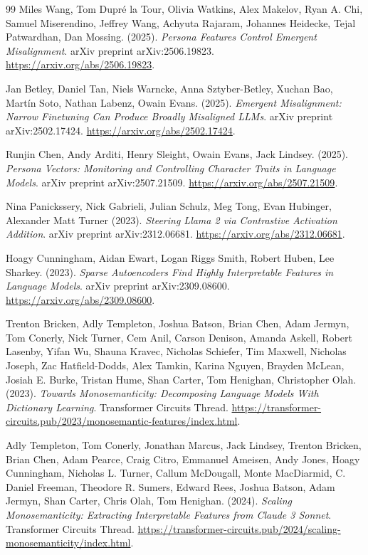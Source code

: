 \documentclass[10pt,a4paper]{article}
\begin{document}
\begin{thebibliography}{99}
Miles Wang, Tom Dupré la Tour, Olivia Watkins, Alex Makelov, Ryan A. Chi, Samuel Miserendino, Jeffrey Wang, Achyuta Rajaram, Johannes Heidecke, Tejal Patwardhan, Dan Mossing. (2025). \textit{Persona Features Control Emergent Misalignment}. arXiv preprint arXiv:2506.19823. \url{https://arxiv.org/abs/2506.19823}.

Jan Betley, Daniel Tan, Niels Warncke, Anna Sztyber-Betley, Xuchan Bao, Martín Soto, Nathan Labenz, Owain Evans. (2025). \textit{Emergent Misalignment: Narrow Finetuning Can Produce Broadly Misaligned LLMs}. arXiv preprint arXiv:2502.17424. \url{https://arxiv.org/abs/2502.17424}.

Runjin Chen, Andy Arditi, Henry Sleight, Owain Evans, Jack Lindsey. (2025). \textit{Persona Vectors: Monitoring and Controlling Character Traits in Language Models}. arXiv preprint arXiv:2507.21509. \url{https://arxiv.org/abs/2507.21509}.

Nina Panickssery, Nick Gabrieli, Julian Schulz, Meg Tong, Evan Hubinger, Alexander Matt Turner (2023). \textit{Steering Llama 2 via Contrastive Activation Addition}. arXiv preprint arXiv:2312.06681. \url{https://arxiv.org/abs/2312.06681}.

Hoagy Cunningham, Aidan Ewart, Logan Riggs Smith, Robert Huben, Lee Sharkey. (2023). \textit{Sparse Autoencoders Find Highly Interpretable Features in Language Models}. arXiv preprint arXiv:2309.08600. \url{https://arxiv.org/abs/2309.08600}.

Trenton Bricken, Adly Templeton, Joshua Batson, Brian Chen, Adam Jermyn, Tom Conerly, Nick Turner, Cem Anil, Carson Denison, Amanda Askell, Robert Lasenby, Yifan Wu, Shauna Kravec, Nicholas Schiefer, Tim Maxwell, Nicholas Joseph, Zac Hatfield-Dodds, Alex Tamkin, Karina Nguyen, Brayden McLean, Josiah E. Burke, Tristan Hume, Shan Carter, Tom Henighan, Christopher Olah. (2023). \textit{Towards Monosemanticity: Decomposing Language Models With Dictionary Learning}. Transformer Circuits Thread. \url{https://transformer-circuits.pub/2023/monosemantic-features/index.html}.

Adly Templeton, Tom Conerly, Jonathan Marcus, Jack Lindsey, Trenton Bricken, Brian Chen, Adam Pearce, Craig Citro, Emmanuel Ameisen, Andy Jones, Hoagy Cunningham, Nicholas L. Turner, Callum McDougall, Monte MacDiarmid, C. Daniel Freeman, Theodore R. Sumers, Edward Rees, Joshua Batson, Adam Jermyn, Shan Carter, Chris Olah, Tom Henighan. (2024). \textit{Scaling Monosemanticity: Extracting Interpretable Features from Claude 3 Sonnet}. Transformer Circuits Thread. \url{https://transformer-circuits.pub/2024/scaling-monosemanticity/index.html}.


\end{thebibliography}
\end{document}
